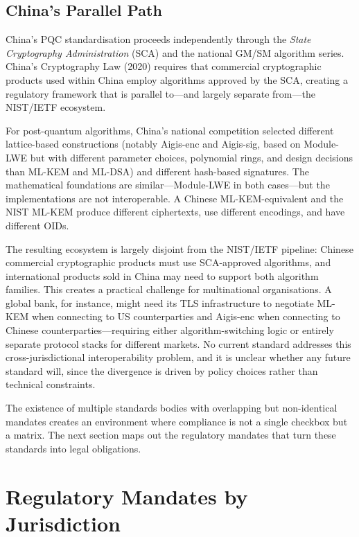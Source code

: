 \subsection{China's Parallel Path}
\label{subsec:china-pqc}

China's PQC standardisation proceeds independently through the \emph{State Cryptography Administration} (SCA) and the national GM/SM algorithm series. China's Cryptography Law (2020) requires that commercial cryptographic products used within China employ algorithms approved by the SCA, creating a regulatory framework that is parallel to---and largely separate from---the NIST/IETF ecosystem.

For post-quantum algorithms, China's national competition selected different lattice-based constructions (notably Aigis-enc and Aigis-sig, based on Module-LWE but with different parameter choices, polynomial rings, and design decisions than ML-KEM and ML-DSA) and different hash-based signatures. The mathematical foundations are similar---Module-LWE in both cases---but the implementations are not interoperable. A Chinese ML-KEM-equivalent and the NIST ML-KEM produce different ciphertexts, use different encodings, and have different OIDs.

The resulting ecosystem is largely disjoint from the NIST/IETF pipeline: Chinese commercial cryptographic products must use SCA-approved algorithms, and international products sold in China may need to support both algorithm families. This creates a practical challenge for multinational organisations. A global bank, for instance, might need its TLS infrastructure to negotiate ML-KEM when connecting to US counterparties and Aigis-enc when connecting to Chinese counterparties---requiring either algorithm-switching logic or entirely separate protocol stacks for different markets. No current standard addresses this cross-jurisdictional interoperability problem, and it is unclear whether any future standard will, since the divergence is driven by policy choices rather than technical constraints.

The existence of multiple standards bodies with overlapping but non-identical mandates creates an environment where compliance is not a single checkbox but a matrix. The next section maps out the regulatory mandates that turn these standards into legal obligations.


\section{Regulatory Mandates by Jurisdiction}
\label{sec:regulatory-mandates}

